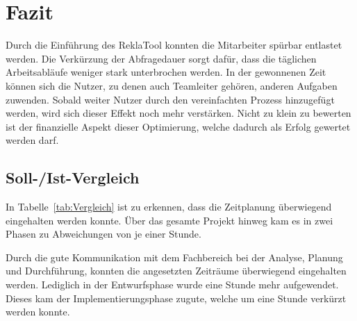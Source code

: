 \section{Fazit} 
\label{sec:Fazit}
Durch die Einführung des ReklaTool konnten die Mitarbeiter spürbar entlastet werden.
Die Verkürzung der Abfragedauer sorgt dafür, dass die täglichen Arbeitsabläufe weniger
stark unterbrochen werden. In der gewonnenen Zeit können sich die Nutzer, zu denen auch
Teamleiter gehören, anderen Aufgaben zuwenden. Sobald weiter Nutzer durch den vereinfachten
Prozess hinzugefügt werden, wird sich dieser Effekt noch mehr verstärken. Nicht zu klein zu bewerten
ist der finanzielle Aspekt dieser Optimierung, welche dadurch als Erfolg gewertet werden darf. 

\subsection{Soll-/Ist-Vergleich}
\label{sec:SollIstVergleich}
In Tabelle~\ref{tab:Vergleich} ist zu erkennen, dass die Zeitplanung überwiegend eingehalten werden konnte.
Über das gesamte Projekt hinweg kam es in zwei Phasen zu Abweichungen von je einer Stunde.\\

Durch die gute Kommunikation mit dem Fachbereich bei der Analyse, Planung und Durchführung, konnten die angesetzten Zeiträume  
überwiegend eingehalten werden. Lediglich in der Entwurfsphase wurde eine Stunde mehr aufgewendet. Dieses kam der Implementierungsphase
zugute, welche um eine Stunde verkürzt werden konnte. 

